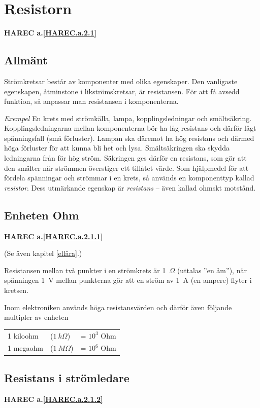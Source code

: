 \section{Resistorn}
 \textbf{HAREC a.\ref{HAREC.a.2.1}\label{myHAREC.a.2.1}}

\subsection{Allmänt}

Strömkretsar består av komponenter med olika egenskaper.
Den vanligaste egenskapen, åtminstone i likströmskretsar, är resistansen.
För att få avsedd funktion, så anpassar man resistansen i komponenterna.

\emph{Exempel}
En krets med strömkälla, lampa, kopplingsledningar och smältsäkring.
Kopplingsledningarna mellan komponenterna bör ha låg resistans och därför lågt
spänningsfall (små förluster). Lampan ska däremot ha hög resistans och därmed
höga förluster för att kunna bli het och lysa. Smältsäkringen ska skydda
ledningarna från för hög ström. Säkringen ges därför en resistans, som gör
att den smälter när strömmen överstiger ett tillåtet värde.
Som hjälpmedel för att fördela spänningar och strömmar i en krets, så används
en komponenttyp kallad \emph{resistor}. Dess utmärkande egenskap är
\emph{resistans} -- även kallad ohmskt motstånd.

\subsection{Enheten Ohm}
\textbf{HAREC a.\ref{HAREC.a.2.1.1}\label{myHAREC.a.2.1.1}}

(Se även kapitel \ref{ellära}.)

Resistansen mellan två punkter i en strömkrets är 1~\(\Omega\) (uttalas
''en åm''), när spänningen 1~V mellan punkterna gör att en ström
av 1~A (en ampere) flyter i kretsen.

Inom elektroniken används höga resistansvärden och därför även följande
multipler av enheten
\begin{tabular}{lll}
  1 kiloohm & (\(1\ k\Omega\)) & = \(10^3\) Ohm \\
  1 megaohm & (\(1\ M\Omega\)) & = \(10^6\) Ohm \\
\end{tabular}

\subsection{Resistans i strömledare}
\textbf{HAREC a.\ref{HAREC.a.2.1.2}\label{myHAREC.a.2.1.2}}

